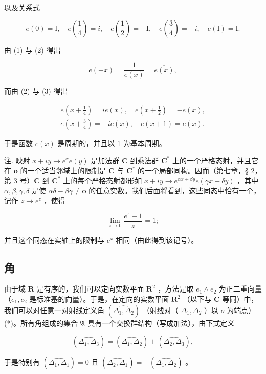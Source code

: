 以及关系式

\[
e (0) = \mathrm{I}, \quad e (\frac {1}{4}) = i, \quad e (\frac {1}{2}) = - \mathrm{I}, \quad e (\frac {3}{4}) = - i, \quad e (\mathrm{I}) = \mathrm{I}. \tag {3}
\]

由 (1) 与 (2) 得出

\[
e (- x) = \frac {1}{e (x)} = \overline {{{{e (x)}}}},\tag{4}
\]

而由 (2) 与 (3) 得出

\[
\begin{array}{l} e (x + \frac {1}{4}) = i e (x), \quad e (x + \frac {1}{2}) = - e (x), \\ e (x + \frac {3}{4}) = - i e (x), \quad e (x + 1) = e (x). \end{array}
\]

于是函数 \(e(x)\) 是周期的，并且以 1 为基本周期。

注. 映射 \(x + iy \to e^x e(y)\) 是加法群 \(\mathbf{C}\) 到乘法群 \(\mathbf{C}^*\) 上的一个严格态射，并且它在 \(\mathbf{o}\) 的一个适当邻域上的限制是 \(\mathbf{C}\) 与 \(\mathbf{C}^*\) 的一个局部同构。因而（第七章，§ 2，第 3 号）\(\mathbf{C}\) 到 \(\mathbf{C}^*\) 上的每个严格态射都形如 \(x + iy \to e^{\alpha x + \beta y} e(\gamma x + \delta y)\) ，其中 \(\alpha, \beta, \gamma, \delta\) 是使 \(\alpha \delta - \beta \gamma \neq \mathbf{o}\) 的任意实数。我们后面将看到，这些同态中恰有一个，记作 \(z \rightarrow e^{z}\) ，使得

\[
\lim _ {z \rightarrow 0} \frac {e ^ {z} - 1}{z} = 1;
\]

并且这个同态在实轴上的限制与 \(e^{x}\) 相同（由此得到该记号）。

\subsection{角}

由于域 \(\mathbf{R}\) 是有序的，我们可以定向实数平面 \(\mathbf{R}^2\) ，方法是取 \(e_1 \wedge e_2\) 为正二重向量（\(e_1, e_2\) 是标准基的向量）。于是，在定向的实数平面 \(\mathbf{R}^2\) （以下与 \(\mathbf{C}\) 等同）中，我们可以对任意一对射线定义角 \((\widehat{\Delta_1, \Delta_2})\) （射线对（ \(\Delta_1, \Delta_2\) ）以 \(o\) 为端点）(*)。所有角组成的集合 \(\mathfrak{A}\) 具有一个交换群结构（写成加法），由下式定义

\[
(\widehat {\Delta_ {1} , \Delta_ {3}}) = (\widehat {\Delta_ {1} , \Delta_ {2}}) + (\widehat {\Delta_ {2} , \Delta_ {3}}),
\]

于是特别有 \((\widehat{\Delta_1, \Delta_1}) = 0\) 且 \((\widehat{\Delta_2, \Delta_1}) = -(\widehat{\Delta_1, \Delta_2})\) 。

